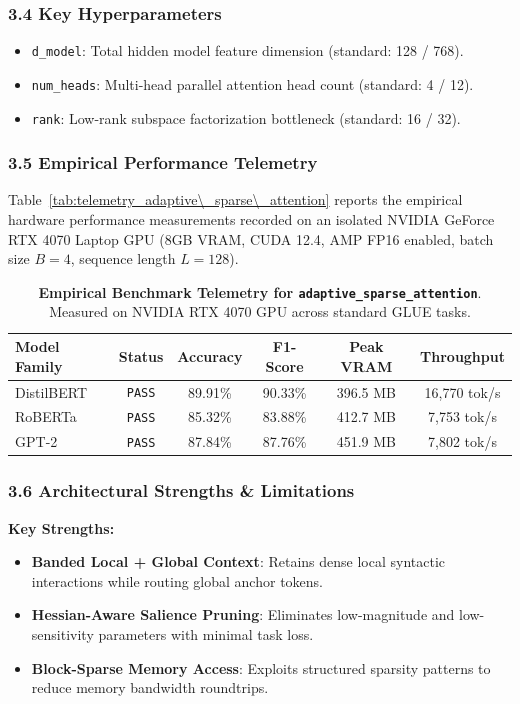 \subsubsection*{3.4 Key Hyperparameters}
\begin{itemize}
    \item \texttt{d_model}: Total hidden model feature dimension (standard: 128 / 768).
    \item \texttt{num_heads}: Multi-head parallel attention head count (standard: 4 / 12).
    \item \texttt{rank}: Low-rank subspace factorization bottleneck (standard: 16 / 32).
\end{itemize}

\subsubsection*{3.5 Empirical Performance Telemetry}
Table~\ref{tab:telemetry_adaptive\_sparse\_attention} reports the empirical hardware performance measurements recorded on an isolated NVIDIA GeForce RTX 4070 Laptop GPU (8GB VRAM, CUDA 12.4, AMP FP16 enabled, batch size $B=4$, sequence length $L=128$).

\begin{table}[h]
\centering
\small
\caption{\textbf{Empirical Benchmark Telemetry for \texttt{adaptive\_sparse\_attention}}. Measured on NVIDIA RTX 4070 GPU across standard GLUE tasks.}
\label{tab:telemetry_adaptive_sparse_attention}
\begin{tabular*}{\columnwidth}{@{\extracolsep{\fill}}lccccc}
\toprule
\textbf{Model Family} & \textbf{Status} & \textbf{Accuracy} & \textbf{F1-Score} & \textbf{Peak VRAM} & \textbf{Throughput} \\
\midrule
DistilBERT & \texttt{PASS} & 89.91\% & 90.33\% & 396.5 MB & 16,770 tok/s \\
RoBERTa    & \texttt{PASS} & 85.32\% & 83.88\% & 412.7 MB & 7,753 tok/s \\
GPT-2      & \texttt{PASS} & 87.84\% & 87.76\% & 451.9 MB & 7,802 tok/s \\
\bottomrule
\end{tabular*}
\end{table}

\subsubsection*{3.6 Architectural Strengths \& Limitations}
\textbf{Key Strengths:}
\begin{itemize}
    \item \textbf{Banded Local + Global Context}: Retains dense local syntactic interactions while routing global anchor tokens.
    \item \textbf{Hessian-Aware Salience Pruning}: Eliminates low-magnitude and low-sensitivity parameters with minimal task loss.
    \item \textbf{Block-Sparse Memory Access}: Exploits structured sparsity patterns to reduce memory bandwidth roundtrips.
\end{itemize}

